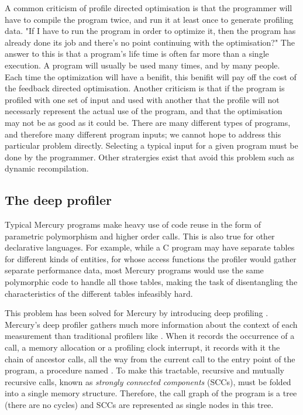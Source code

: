 A common criticism of profile directed optimisation is that the programmer will
have to compile the program twice,
and run it at least once to generate profiling data.
"If I have to run the program in order to optimize it, then the program has
already
done its job and there's no point continuing with the optimisation?"
The answer to this is that a program's life time is often far more than a
single execution.
A program will usually be used many times, and by many people.
Each time the optimization will have a benifit,
this benifit will pay off the cost of the feedback directed optimisation.
Another criticism is that if the program is profiled with one set of input and
used with another that the profile will not necessarly represent the actual use
of the program,
and that the optimisation may not be as good as it could be.
There are many different types of programs, and therefore many different
program inputs;
we cannot hope to address this particular problem directly.
Selecting a typical input for a given program must be done by the programmer.
Other stratergies exist that avoid this problem
such as dynamic recompilation.

\subsection{The deep profiler}

Typical Mercury programs make heavy use of code reuse in the form of
parametric polymorphism and higher order calls.
This is also true for other declarative languages.
For example, while a C program may have
separate tables for different kinds of entities,
for whose access functions
the profiler would gather separate performance data,
most Mercury programs would use
the same polymorphic code to handle all those tables,
making the task of disentangling the characteristics of the different tables
infeasibly hard.

This problem has been solved for Mercury by introducing deep profiling
\citep{conway:2001:mercury-deep}.
Mercury's deep profiler gathers much more information about the context of
each measurement than traditional profilers like \cite{gprof}.
When it records the occurrence of a call,
a memory allocation or a profiling clock interrupt,
it records with it the chain of ancestor calls,
all the way from the current call to the entry point of the program,
a procedure named .
To make this tractable,
recursive and mutually recursive calls,
known as \emph{strongly connected components} (SCCs),
must be folded into a single memory structure.
Therefore, the call graph of the program is a tree (there are no cycles)
and SCCs are represented as single nodes in this tree.

